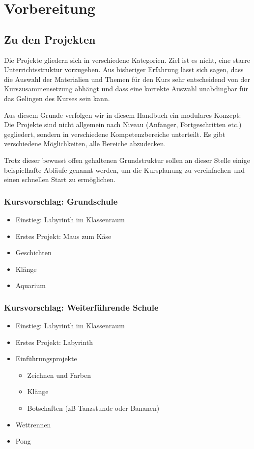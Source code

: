 \chapter {Vorbereitung}

\section{Zu den Projekten}
Die Projekte gliedern sich in verschiedene Kategorien. Ziel ist es nicht, eine starre Unterrichtsstruktur vorzugeben. Aus bisheriger Erfahrung lässt sich sagen, dass die Auswahl der Materialien und Themen für den Kurs sehr entscheidend von der Kurszusammensetzung abhängt und dass eine korrekte Auswahl unabdingbar für das Gelingen des Kurses sein kann.

Aus diesem Grunde verfolgen wir in diesem Handbuch ein modulares Konzept: Die Projekte sind nicht allgemein nach Niveau (Anfänger, Fortgeschritten etc.) gegliedert, sondern in verschiedene Kompetenzbereiche unterteilt. Es gibt verschiedene Möglichkeiten, alle Bereiche abzudecken.

Trotz dieser bewusst offen gehaltenen Grundstruktur sollen an dieser Stelle einige beispielhafte Abläufe genannt werden, um die Kursplanung zu vereinfachen und einen schnellen Start zu ermöglichen.

\subsection{Kursvorschlag: Grundschule}

\begin{itemize}
	\item Einstieg: Labyrinth im Klassenraum %
    \item Erstes Projekt: Maus zum Käse
    \item Geschichten
    \item Klänge
    \item Aquarium
\end{itemize}

\subsection{Kursvorschlag: Weiterführende Schule}
\begin{itemize}
	\item Einstieg: Labyrinth im Klassenraum %
    \item Erstes Projekt: Labyrinth
    \item Einführungsprojekte
    \begin{itemize}
        \item Zeichnen und Farben
        \item Klänge
        \item Botschaften (zB Tanzstunde oder Bananen)
    \end{itemize}
    \item Wettrennen
    \item Pong
\end{itemize}


